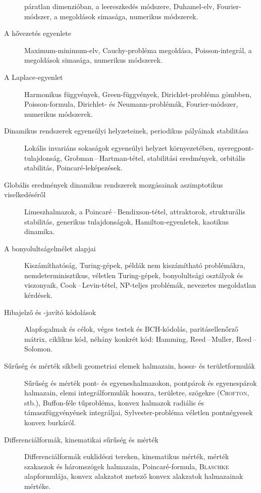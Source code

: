 \documentclass[DIV=15,appendixprefix]{scrreprt}
\theoremstyle{definition}
\theoremstyle{remark}
\begin{document}
\begin{description}
	páratlan dimenzióban, a leereszkedés módszere, Duhamel-elv, Fourier-módszer, a megoldások
	simasága, numerikus módszerek.
%
	\item[A hővezetés egyenlete] Maximum-minimum-elv, Cauchy-probléma megoldása, Poisson-integrál,
	a megoldások simasága, numerikus módszerek.
%
	\item[A Laplace-egyenlet] Harmonikus függvények, Green-függvények, Dirichlet-probléma gömbben,
	Po\-is\-son-formula, Dirichlet- és Neumann-problémák, Fourier-módszer, numerikus módszerek.
%
	\item[Dinamikus rendszerek egyensúlyi helyzeteinek, periodikus pályáinak stabilitása] Lokális
	invariáns sokaságok egyensúlyi helyzet környezetében, nyeregpont-tulajdonság,
	Grobman\,--\,Hartman-tétel, stabilitási eredmények, orbitális stabilitás, Poincaré-leképezések.
%
	\item[Globális eredmények dinamikus rendszerek mozgásainak aszimptotikus viselkedéséről]
	Li\-mesz\-hal\-ma\-zok, a Poincaré\,--\,Bendixson-tétel, attraktorok, strukturális stabilitás, generikus
	tulajdonságok, Hamilton-egyenletek, kaotikus dinamika.
%
	\item[A bonyolultságelmélet alapjai] Kiszámíthatóság, Turing-gépek, példák nem kiszámítható
	problémákra, nemdeterminisztikus, véletlen Turing-gépek, bonyolultsági osztályok és viszonyaik,
	Cook\,--\,Levin-tétel, NP-teljes problémák, nevezetes megoldatlan kérdések.
%
	\item[Hibajelző és -javító kódolások] Alapfogalmak és célok, véges testek és BCH-kódolás,
	paritásellenőrző mátrix, ciklikus kód, néhány konkrét kód: Hamming, Reed\,--\,Muller,
	Reed\,--\,Solomon.
%
	\item[Sűrűség és mérték síkbeli geometriai elemek halmazain, hossz- és területformulák] Sűrűség
	és mérték pont- és egyeneshalmazokon, pontpárok és egyenespárok halmazain, elemi
	integrálformulák hosszra, területre, szögekre (\textsc{Crofton}, stb.), Buffon-féle tűprobléma,
	konvex halmazok radiális és támaszfüggvényének integráljai, Sylvester-probléma véletlen
	pontnégyesek konvex burkáról.
%
	\item[Differenciálformák, kinematikai sűrűség és mérték] Differenciálformák euklidészi tereken,
	kinematikus mérték, mérték szakaszok és háromszögek halmazain, Poincaré-formula,
	\textsc{Blaschke} alapformulája, konvex alakzatot metsző konvex alakzatok halmazainak mértéke.
\end{description}
%


\nocite{*}
\end{document}
